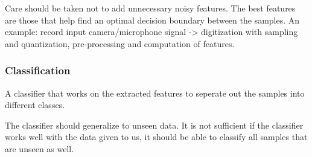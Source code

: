 \documentclass{article}
\begin{document}
Care should be taken not to add unnecessary noisy features. The best features are those that help find an optimal decision boundary between the samples. An example: record input camera/microphone signal -> digitization with sampling and quantization, pre-processing and computation of features.

\subsubsection{Classification}
A classifier that works on the extracted features to seperate out the samples into different classes. 

The classifier should generalize to unseen data. It is not sufficient if the classifier works well with the data given to us, it should be able to classify all samples that are unseen as well.
\end{document}
